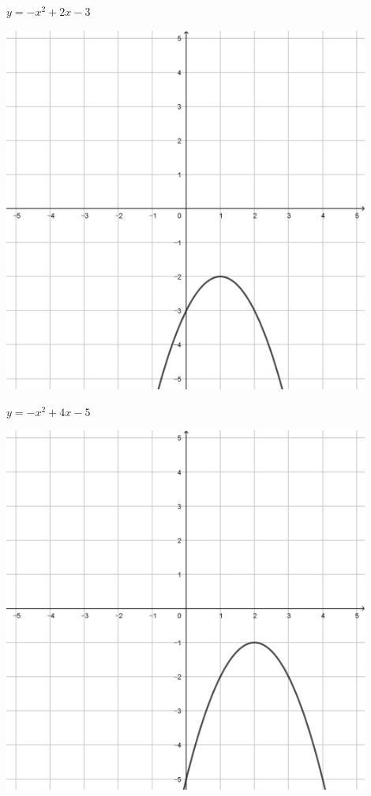 \documentclass[a4paper]{oblivoir}
\begin{document}
\clearpage
\begin{minipage}{0.45\textwidth}\centering
\(y=-x^2+2x-3\)
\par\bigskip\includegraphics[width=0.9\textwidth]{img/11-1}
\end{minipage}
\begin{minipage}{0.45\textwidth}\centering
\(y=-x^2+4x-5\)
\par\bigskip\includegraphics[width=0.9\textwidth]{img/11-2}
\end{minipage}\bigskip\bigskip\par
\end{document}
